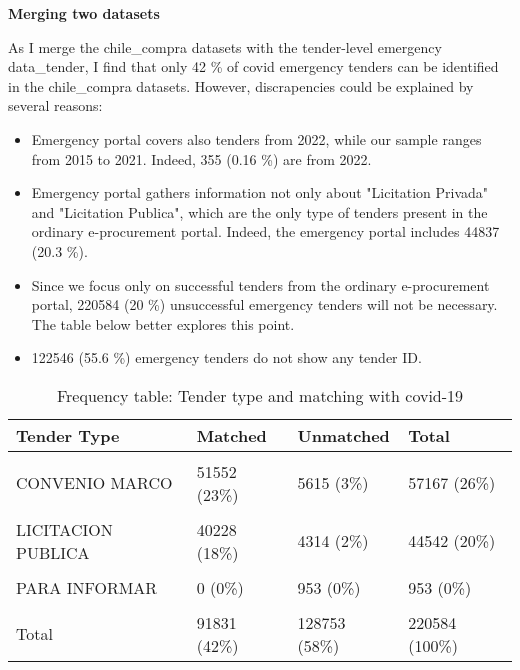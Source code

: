 \documentclass[
]{article}
\begin{document}
\textbf{Merging two datasets}

As I merge the chile\_compra datasets with the tender-level emergency
data\_tender, I find that only 42 \% of covid emergency tenders can be
identified in the chile\_compra datasets. However, discrapencies could
be explained by several reasons:

\begin{itemize}
  \item Emergency portal covers also tenders from 2022, while our sample ranges from 2015 to 2021. Indeed, 355 (0.16 \%) are from 2022. 
  \item Emergency portal gathers information not only about "Licitation Privada" and "Licitation Publica", which are the only type of tenders present in the ordinary e-procurement portal. Indeed, the emergency portal includes 44837 (20.3 \%).
  \item Since we focus only on successful tenders from the ordinary e-procurement portal, 220584 (20 \%) unsuccessful emergency tenders will not be necessary. The table below better explores this point. 
  \item 122546 (55.6 \%) emergency tenders do not show any tender ID. 
\end{itemize}

\begin{longtable}[t]{llll}
\caption{\label{tab:freq table for tag}Frequency table: Tender type and matching with covid-19}\\
\toprule
Tender Type & Matched & Unmatched & Total\\
\midrule
\cellcolor{gray!6}{COMPRA AGIL} & \cellcolor{gray!6}{0  (0\%)} & \cellcolor{gray!6}{38096 (17\%)} & \cellcolor{gray!6}{38096  (17\%)}\\
CONVENIO MARCO & 51552 (23\%) & 5615  (3\%) & 57167  (26\%)\\
\cellcolor{gray!6}{LICITACION PRIVADA} & \cellcolor{gray!6}{49  (0\%)} & \cellcolor{gray!6}{246  (0\%)} & \cellcolor{gray!6}{295   (0\%)}\\
LICITACION PUBLICA & 40228 (18\%) & 4314  (2\%) & 44542  (20\%)\\
\cellcolor{gray!6}{MICROCOMPRA} & \cellcolor{gray!6}{0  (0\%)} & \cellcolor{gray!6}{4  (0\%)} & \cellcolor{gray!6}{4   (0\%)}\\
\addlinespace
PARA INFORMAR & 0  (0\%) & 953  (0\%) & 953   (0\%)\\
\cellcolor{gray!6}{TRATO DIRECTO} & \cellcolor{gray!6}{2  (0\%)} & \cellcolor{gray!6}{79525 (36\%)} & \cellcolor{gray!6}{79527  (36\%)}\\
Total & 91831 (42\%) & 128753 (58\%) & 220584 (100\%)\\
\bottomrule
\end{longtable}
\end{document}
